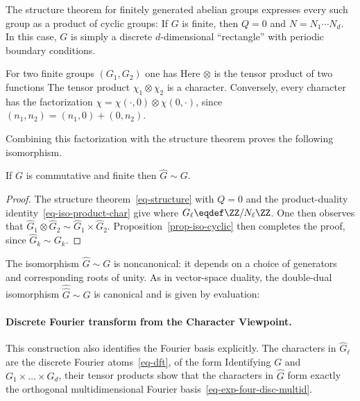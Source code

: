 The structure theorem for finitely generated abelian groups expresses every such group as a product of cyclic groups:
If $G$ is finite, then $Q=0$ and $N=N_1\cdots N_d$. In this case, $G$ is simply a discrete $d$-dimensional ``rectangle'' with periodic boundary conditions.

For two finite groups $(G_1,G_2)$ one has 
Here $\otimes$ is the tensor product of two functions
The tensor product $\chi_1 \otimes \chi_2$ is a character. Conversely, every character has the factorization $\chi=\chi(\cdot,0) \otimes \chi(0,\cdot)$, since $(n_1,n_2)=(n_1,0)+(0,n_2)$.

Combining this factorization with the structure theorem proves the following isomorphism.

\begin{prop}
	If $G$ is commutative and finite then $\hat G \sim G$.
\end{prop}
\begin{proof}
	The structure theorem~\eqref{eq-structure} with $Q=0$ and the product-duality identity~\eqref{eq-iso-product-char} give
	where $G_\ell \eqdef \ZZ/N_\ell\ZZ$.
	One then observes that  $\hat G_1 \otimes \hat G_2 \sim \hat G_1 \times \hat G_2$.
	Proposition~\ref{prop-iso-cyclic} then completes the proof, since $\hat G_k \sim G_k$.
\end{proof}

The isomorphism $\hat G \sim G$ is noncanonical: it depends on a choice of generators and corresponding roots of unity. As in vector-space duality, the double-dual isomorphism $\hat{\hat{G}} \sim G$ is canonical and is given by evaluation:

\paragraph{Discrete Fourier transform from the Character Viewpoint.}

This construction also identifies the Fourier basis explicitly. The characters in $\hat G_\ell$ are the discrete Fourier atoms~\eqref{eq-dft}, of the form
Identifying $G$ and $G_1 \times \ldots \times G_d$, 
their tensor products show that the characters in $\hat G$ form exactly the orthogonal multidimensional Fourier basis~\eqref{eq-exp-four-disc-multid}.

